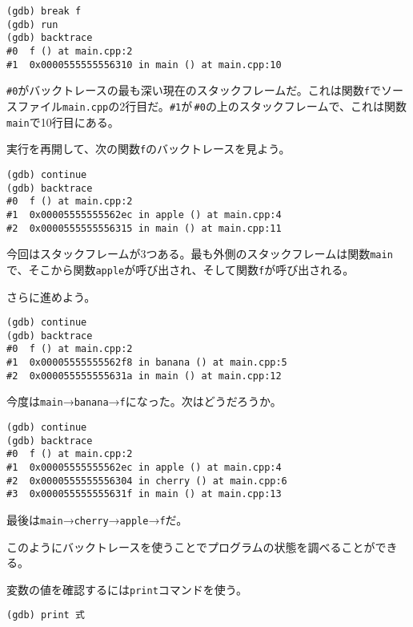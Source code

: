 \ifTombow\pagebreak\fi
\begin{lstlisting}[style=terminal]
(gdb) break f
(gdb) run
(gdb) backtrace
#0  f () at main.cpp:2
#1  0x0000555555556310 in main () at main.cpp:10
\end{lstlisting}

\texttt{\#0}がバックトレースの最も深い現在のスタックフレームだ。これは関数\texttt{f}でソースファイル\texttt{main.cpp}の2行目だ。\texttt{\#1}が\,\texttt{\#0}の上のスタックフレームで、これは関数\texttt{main}で10行目にある。

実行を再開して、次の関数\texttt{f}のバックトレースを見よう。

\begin{lstlisting}[style=terminal]
(gdb) continue
(gdb) backtrace
#0  f () at main.cpp:2
#1  0x00005555555562ec in apple () at main.cpp:4
#2  0x0000555555556315 in main () at main.cpp:11
\end{lstlisting}

今回はスタックフレームが3つある。最も外側のスタックフレームは関数\texttt{main}で、そこから関数\texttt{apple}が呼び出され、そして関数\texttt{f}が呼び出される。

さらに進めよう。

\begin{lstlisting}[style=terminal]
(gdb) continue
(gdb) backtrace
#0  f () at main.cpp:2
#1  0x00005555555562f8 in banana () at main.cpp:5
#2  0x000055555555631a in main () at main.cpp:12
\end{lstlisting}

今度は\texttt{main}→\texttt{banana}→\texttt{f}になった。次はどうだろうか。

\begin{lstlisting}[style=terminal]
(gdb) continue
(gdb) backtrace
#0  f () at main.cpp:2
#1  0x00005555555562ec in apple () at main.cpp:4
#2  0x0000555555556304 in cherry () at main.cpp:6
#3  0x000055555555631f in main () at main.cpp:13
\end{lstlisting}

最後は\texttt{main}→\texttt{cherry}→\texttt{apple}→\texttt{f}だ。

このようにバックトレースを使うことでプログラムの状態を調べることができる。

\clearpage
{}

変数の値を確認するには\texttt{print}コマンドを使う。

\begin{lstlisting}[style=terminal]
(gdb) print 式
\end{lstlisting}

